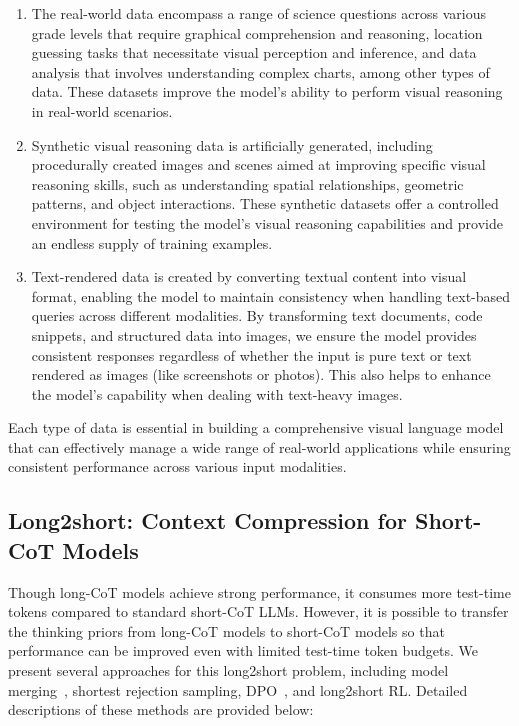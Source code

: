 \documentclass{article}
\newcommand{\citep}[1]{\parencite{#1}}
\begin{document}
\begin{enumerate}
\item The real-world data encompass a range of science questions across various grade levels that require graphical comprehension and reasoning, location guessing tasks that necessitate visual perception and inference, and data analysis that involves understanding complex charts, among other types of data. These datasets improve the model's ability to perform visual reasoning in real-world scenarios.

\item Synthetic visual reasoning data is artificially generated, including procedurally created images and scenes aimed at improving specific visual reasoning skills, such as understanding spatial relationships, geometric patterns, and object interactions. These synthetic datasets offer a controlled environment for testing the model’s visual reasoning capabilities and provide an endless supply of training examples.

\item Text-rendered data is created by converting textual content into visual format, enabling the model to maintain consistency when handling text-based queries across different modalities. By transforming text documents, code snippets, and structured data into images, we ensure the model provides consistent responses regardless of whether the input is pure text or text rendered as images (like screenshots or photos). This also helps to enhance the model's capability when dealing with text-heavy images.

\end{enumerate}

Each type of data is essential in building a comprehensive visual language model that can effectively manage a wide range of real-world applications while ensuring consistent performance across various input modalities.



\subsection{Long2short: Context Compression for Short-CoT Models}
\label{sec:long-to-short}

Though long-CoT models achieve strong performance, it consumes more test-time tokens compared to standard short-CoT LLMs. However, it is possible to transfer the thinking priors from long-CoT models to short-CoT models so that performance can be improved even with limited test-time token budgets. We present several approaches for this long2short problem, 
including model merging~\citep{yang2024model}, shortest rejection sampling, DPO~\citep{rafailov2024direct}, and long2short RL. 
Detailed descriptions of these methods are provided below:
\end{document}
